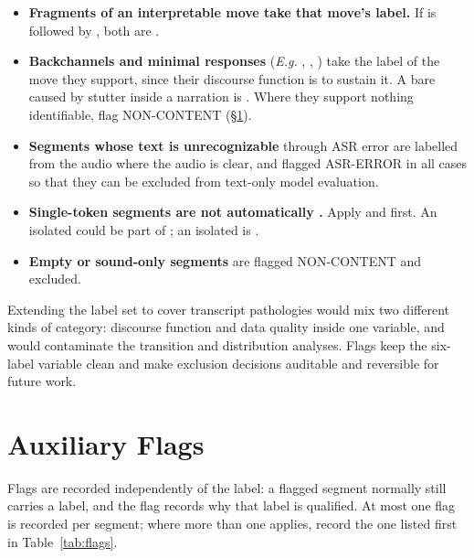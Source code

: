 \begin{itemize}
  \item {} \textbf{Fragments of an interpretable
    move take that move's label.} If  is followed
    by , both are \PBP{}.

  \item {} \textbf{Backchannels and minimal responses} (\textit{E.g.} , , ) take the label of the move they support, since their discourse function is to sustain it. A bare  caused by stutter inside a narration is \PBP{}. Where they support nothing identifiable, flag \textsf{NON-CONTENT} (\S\ref{sec:flags}).

  \item {} \textbf{Segments whose text is unrecognizable} through ASR error are labelled from the audio where the audio is clear, and flagged \textsf{ASR-ERROR} in all cases so that they can be excluded from text-only model evaluation.

  \item {} \textbf{Single-token segments are not automatically \HYP{}.} Apply  and  first. An isolated  could be part of \SA{}; an isolated  is \HYP{}.

  \item {} \textbf{Empty or sound-only segments} are flagged \textsf{NON-CONTENT} and excluded.
\end{itemize}

\begin{agrulebox}
Extending the label set to cover transcript pathologies would mix two different kinds of category: discourse function and data quality inside one variable, and would contaminate the transition and distribution analyses. Flags keep the six-label variable clean and make exclusion decisions auditable and reversible for future work.
\end{agrulebox}

\section{Auxiliary Flags}
\label{sec:flags}

Flags are recorded independently of the label: a flagged segment normally still carries a label, and the flag records why that label is qualified. At most one flag is recorded per segment; where more than one applies, record the one listed first in Table~\ref{tab:flags}.

